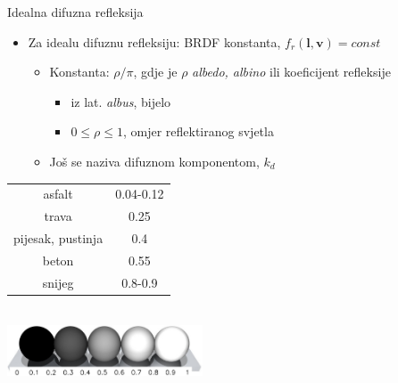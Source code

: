 \documentclass[9pt]{beamer}
\begin{document}
\begin{frame}{Idealna difuzna refleksija}
	\begin{itemize}
		\item Za idealu difuznu refleksiju: BRDF konstanta, $f_r(\mathbf{l}, \mathbf{v}) = const$
		\begin{itemize}
			\item Konstanta: $\rho/\pi$, gdje je $\rho$ \textsl{albedo, albino} ili koeficijent refleksije
			\begin{itemize}
				\item iz lat. \textsl{albus}, bijelo 
				\item $0 \leq \rho \leq 1$, omjer reflektiranog svjetla
			\end{itemize}
			\item Još se naziva difuznom komponentom, $k_d$
		\end{itemize}
	\end{itemize}
	
	\begin{center}
		\begin{tabular}{|c|c|}
			\hline  asfalt& 0.04-0.12 \\ 
			trava &  0.25\\ 
			pijesak, pustinja& 0.4 \\ 
			beton& 0.55 \\ 
			snijeg& 0.8-0.9 \\ 
			\hline 
		\end{tabular} 
		\\
		\includegraphics[height=1.5cm]{slike/albedo.jpg}
	\end{center}
\end{frame}
\end{document}
